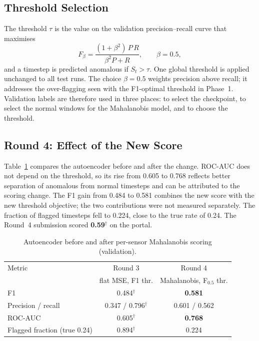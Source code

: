 \documentclass[runningheads]{llncs}
\newcommand{\doc}{$^\dagger$}
\begin{document}
\subsection{Threshold Selection}

The threshold $\tau$ is the value on the validation precision--recall curve that maximises
\begin{equation}
  F_\beta = \frac{(1+\beta^2)\,P\,R}{\beta^2 P + R}, \qquad \beta = 0.5,
\end{equation}
and a timestep is predicted anomalous if $S_t > \tau$. One global threshold is applied unchanged to all test runs. The choice $\beta = 0.5$ weights precision above recall; it addresses the over-flagging seen with the F1-optimal threshold in Phase~1. Validation labels are therefore used in three places: to select the checkpoint, to select the normal windows for the Mahalanobis model, and to choose the threshold.

\subsection{Round 4: Effect of the New Score}

Table~\ref{tab:round4} compares the autoencoder before and after the change. ROC-AUC does not depend on the threshold, so its rise from 0.605 to 0.768 reflects better separation of anomalous from normal timesteps and can be attributed to the scoring change. The F1 gain from 0.484 to 0.581 combines the new score with the new threshold objective; the two contributions were not measured separately. The fraction of flagged timesteps fell to 0.224, close to the true rate of 0.24. The Round~4 submission scored \textbf{0.59}\doc{} on the portal.

\begin{table}[ht]
\centering
\caption{Autoencoder before and after per-sensor Mahalanobis scoring (validation).}\label{tab:round4}
\begin{tabular}{lcc}
\toprule
Metric & Round 3 & Round 4 \\
 & flat MSE, F1 thr. & Mahalanobis, F$_{0.5}$ thr. \\
\midrule
F1 & 0.484\doc & \textbf{0.581} \\
Precision / recall & 0.347 / 0.796\doc & 0.601 / 0.562 \\
ROC-AUC & 0.605\doc & \textbf{0.768} \\
Flagged fraction (true 0.24) & 0.894\doc & 0.224 \\
\bottomrule
\end{tabular}
\end{table}
\end{document}
